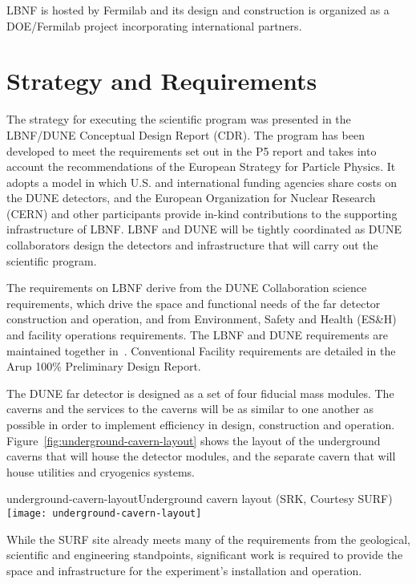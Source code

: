 LBNF is hosted by Fermilab and its design and construction is organized as a DOE/Fermilab project incorporating international partners. 


\section{Strategy and Requirements}
\label{sec:fs-facil-cf}

The strategy for executing the scientific program was presented in the LBNF/DUNE Conceptual Design Report (CDR)\cite{cd-1-r-cdr}. The program has been developed to meet the requirements set out in the P5 report \cite{p5report2014} and takes into account the recommendations of the European Strategy for Particle Physics\cite{euro-strat-2013}. It adopts a model in which U.S. and international funding agencies share costs on the DUNE detectors, and the European Organization for Nuclear Research (CERN) and other participants provide in-kind contributions to the supporting infrastructure of LBNF. LBNF and DUNE will be tightly coordinated as DUNE collaborators design the detectors and infrastructure that will carry out the scientific program.

The requirements on LBNF derive from the DUNE Collaboration science requirements\cite{dune-sci-req}, which drive the space and functional needs of the far detector construction and operation, and from 
Environment, Safety and Health (ES\&H) and facility operations requirements. 
 The LBNF and DUNE requirements are maintained together in~\cite{dune-sci-req}.
Conventional Facility requirements are detailed in the Arup 100\% Preliminary Design Report\cite{arup:fscf100pdr}.

The DUNE far detector is designed as a set of four  fiducial mass modules. 
The caverns and the services to the caverns will be as similar to one another as possible in order to implement efficiency in 
design, construction and operation. Figure~\ref{fig:underground-cavern-layout} shows the layout of the underground caverns that will house the detector modules, and the separate cavern that will house utilities and cryogenics systems. 

\begin{cdrfigure}{underground-cavern-layout}{Underground cavern layout (SRK, Courtesy SURF)}
\texttt{[image: underground-cavern-layout]}
\end{cdrfigure}


While the SURF site already meets many of the requirements from the geological, scientific and engineering standpoints, significant work is required to provide %
the space and %
infrastructure %
for the experiment's installation and operation. 

